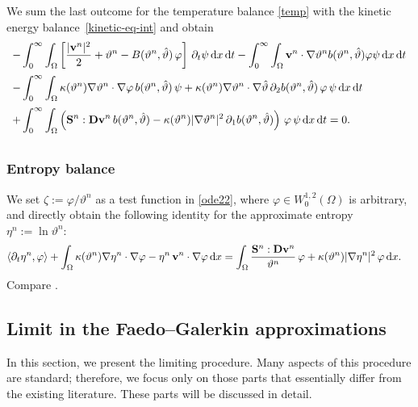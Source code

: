 \documentclass[11pt, a4paper, reqno]{amsart}
\newcommand{\dual}[2]{\langle #1,#2\rangle}
\numberwithin{equation}{section}
\newcommand{\dert}{\partial_t}
\newcommand{\thetah}{\hat\thet}
\newcommand{\vc}[1]{{\bf #1}}
\newcommand{\vv}{\vc{v}}
\newcommand{\thet}{\vartheta}
\renewcommand{\S}{\mathbf{S}}
\newcommand{\D}{\mathbf{D}}
\newcommand{\dt}{\,{\rm d} t }
\newcommand{\dx}{\,{\rm d} {x}}
\newcommand{\intnO}[1]{\int_0^{\infty}\intO{ #1 }\dt}
\newcommand{\intO}[1]{\int_{\Omega} #1 \dx}
\newcommand{\bb}{b}
\newcommand{\B}{B}
\begin{document}
We sum the last outcome for the temperature balance \eqref{temp} with the kinetic energy balance~\eqref{kinetic-eq-int} and obtain
\begin{equation}\label{2.8}
\begin{array}{l}\displaystyle\vspace{6pt}
  - \intnO{\left[\frac{|\vv^n|^2}{2} + \thet^{n} - \B(\thet^n, \thetah)\,\varphi\right] \,\partial_t \psi}-\intnO{\vv^{n}\cdot\nabla \thet^{n}\bb(\thet^n, \thetah)\varphi \psi}
  \\
 \displaystyle\vspace{6pt}
 - \intnO{\kappa(\thet^n)\nabla\thet^{n}\cdot \nabla \varphi\, \bb(\thet^n, \thetah)\,\psi +\kappa(\thet^n)\nabla\thet^{n}\cdot\nabla\thetah \,\partial_{2} \bb(\thet^n, \thetah)\,\varphi \,\psi}\\ \displaystyle\vspace{6pt}
 + \intnO{\left(\S^{n}: \D\vv^{n} \,\bb(\thet^n, \thetah)-\kappa(\thet^n)|\nabla\thet^{n}|^2 \,\partial_1\bb(\thet^n, \thetah)\right) \,\varphi \,\psi}=0.
\end{array}
\end{equation}


\subsubsection{Entropy balance}\label{sec:EB}
We set $\zeta := \varphi / \thet^n$ as a test function in \eqref{ode22}, where $\varphi \in W^{1,2}_0(\Omega)$ is arbitrary, and directly obtain the following identity for the approximate entropy $\eta^n := \ln \thet^n$:
\begin{equation}
\begin{split}\label{entropy-weak}
&\dual{\dert \eta^n}{\varphi} + \intO{\kappa(\thet^n)\nabla\eta^n \cdot\nabla\varphi - \eta^n\,\vv^n\cdot \nabla\varphi} = \intO{\frac{\S^n:\D{\vv}^n}{\thet^n}\,\varphi+\kappa(\thet^n)|\nabla\eta^n|^2\,\varphi}.
\end{split}
\end{equation}
Compare \cite[Section 3, Part B]{ABK22}. 

\subsection{Limit in the Faedo--Galerkin approximations}In this section, we present the limiting procedure. Many aspects of this procedure are standard; therefore, we focus only on those parts that essentially differ from the existing literature. These parts will be discussed in detail.
\end{document}
